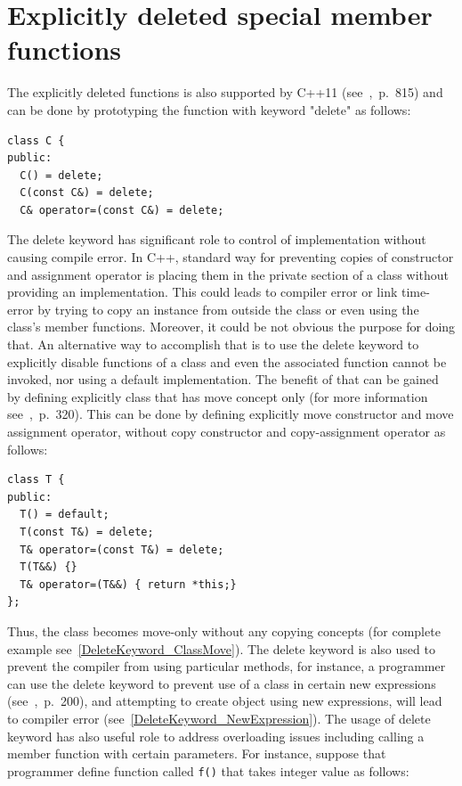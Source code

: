 \documentclass[11pt]{report}
\begin{document}
\section{Explicitly deleted special member functions}
\label{section: Deleted special member functions}
The explicitly deleted functions is also supported by C++11 (see~\cite{Horstmann:2008:BC},~p.~815) and can be done by prototyping the function with keyword "delete" as follows:
\begin{lstlisting}
class C {
public:
  C() = delete; 
  C(const C&) = delete; 
  C& operator=(const C&) = delete;
\end{lstlisting}
The delete keyword has significant role to control of implementation without causing compile error. In C++, standard way for preventing copies of constructor and assignment operator is placing them in the private section of a class without providing an implementation. This could leads to compiler error or link time-error by trying to copy an instance from outside the class or even using the class's member functions. Moreover, it could be not obvious the purpose for doing that. An alternative way to accomplish that is to use the delete keyword to explicitly disable functions of a class and even the associated function cannot be invoked, nor using a default implementation. The benefit of that can be gained by defining explicitly class that has move concept only (for more information see~\cite{Williams:2012:CCA},~p.~320). This can be done by defining explicitly move constructor and move assignment operator, without copy constructor and copy-assignment operator as follows:
\begin{lstlisting}
class T {
public:
  T() = default;
  T(const T&) = delete;
  T& operator=(const T&) = delete;
  T(T&&) {}
  T& operator=(T&&) { return *this;}
};
\end{lstlisting}
Thus, the class becomes move-only without any copying concepts (for complete example see~\ref{DeleteKeyword_ClassMove}). The delete keyword is also used to prevent the compiler from using particular methods, for instance, a programmer can use the delete keyword to prevent use of a class in certain new expressions (see~\cite{ISO:2011:Cpplanguage},~p.~200), and attempting to create object using new expressions, will lead to compiler error (see~\ref{DeleteKeyword_NewExpression}). The usage of delete keyword has also useful role to address overloading issues including calling a member function with certain parameters. For instance, suppose that programmer define function called \texttt{f()} that takes integer value as follows:
\end{document}
